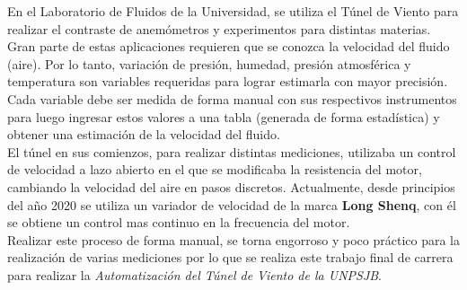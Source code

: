 En el Laboratorio de Fluidos de la Universidad, se utiliza el Túnel de Viento para realizar el contraste de anemómetros y experimentos para distintas materias. Gran parte de estas aplicaciones requieren que se conozca la velocidad del fluido (aire). Por lo tanto, variación de presión, humedad, presión atmosférica y temperatura son variables requeridas para lograr estimarla con mayor precisión.
Cada variable debe ser medida de forma manual con sus respectivos instrumentos para luego ingresar estos valores a una tabla (generada de forma estadística) y obtener una estimación de la velocidad del fluido.\\

El túnel en sus comienzos, para realizar distintas mediciones, utilizaba un control de velocidad a lazo abierto en el que se modificaba la resistencia del motor, cambiando la velocidad del aire en pasos discretos. Actualmente, desde principios del año 2020 se utiliza un variador de velocidad de la marca \textbf{Long Shenq}, con él se obtiene un control mas continuo en la frecuencia del motor. \\

Realizar este proceso de forma manual, se torna engorroso y poco práctico para la realización de varias mediciones por lo que se realiza este trabajo final de carrera para realizar la \textit{Automatización del Túnel de Viento de la UNPSJB}.

\newpage